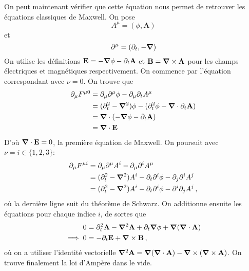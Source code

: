 \documentclass{article}
\numberwithin{equation}{section}
\theoremstyle{solution}
\begin{document}
On peut maintenant vérifier que cette équation nous permet de retrouver les équations classiques de Maxwell. On pose
\begin{equation}
        A^{\mu} = (\phi, \mathbf{A})
\end{equation} 
et
\begin{equation}
        \partial^{\mu} = (\partial_{t}, -\grad)
\end{equation} 
On utilise les définitions $\mathbf{E} = -\grad \phi - \partial_t \mathbf{A}$ et $\mathbf{B} = \grad \times \mathbf{A}$ pour les 
champs électriques et magnétiques respectivement.
On commence par l'équation correspondant avec $\nu=0$.
On trouve que
\begin{align*}
        \partial_{\mu}F^{\mu 0} &= \partial_{\mu} \partial^{\mu}\phi - \partial_{\mu}\partial_{t}A^{\mu} \\
                &= (\partial_{t}^{2} - \grad^{2})\phi - (\partial_{t}^{2}\phi - \grad \cdot \partial_{t}\mathbf{A}) \\
                &= \grad \cdot (-\grad \phi - \partial_t \mathbf{A}) \\
                &= \grad \cdot \mathbf{E}
\end{align*}
D'où $\grad \cdot \mathbf{E} = 0$, la première équation de Maxwell.
On poursuit avec $\nu = i \in \{1,2,3\}$:
\begin{align*}
        \partial_{\mu}F^{\mu i} &= \partial_{\mu}\partial^{\mu}A^{i} - \partial_{\mu}\partial^{i}A^{\mu} \\
                &= (\partial_{t}^{2} - \grad^{2})A^{i} - \partial_{t}\partial^{i}\phi - \partial_{j}\partial^{i}A^{j} \\
                &= (\partial_{t}^{2} - \grad^{2})A^{i} - \partial_{t}\partial^{i}\phi - \partial^{i}\partial_j A^{j}\, ,
\end{align*}
où la dernière ligne suit du théorème de Schwarz. 
On additionne ensuite les équations pour chaque indice $i$, de sortes que 
\begin{align*}
        0 &= \partial_{t}^{2}\mathbf{A} - \grad^{2}\mathbf{A} + \partial_{t}\grad \phi + \grad (\grad \cdot \mathbf{A}) \\
        \implies 0 &= -\partial_{t}\mathbf{E} + \grad \times \mathbf{B}\, ,
\end{align*}
où on a utiliser l'identité vectorielle $\grad^{2}\mathbf{A} = \grad (\grad \cdot \mathbf{A}) - \grad \times (\grad \times \mathbf{A})$. On trouve finalement la loi d'Ampère dans le vide. 
\end{document}
